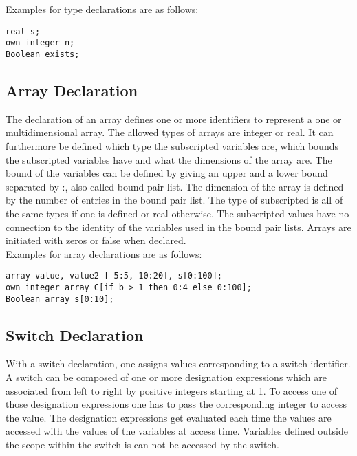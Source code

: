 \documentclass{article}
\begin{document}
Examples for type declarations are as follows:\\ 
\begin{lstlisting}[language={[60]algol}]
real s;
own integer n;
Boolean exists;
\end{lstlisting}

\subsection{Array Declaration} \label{arrayDecl}
The declaration of an array defines one or more identifiers to represent a one or multidimensional array. The allowed types of arrays are integer or real. It can furthermore be defined which type the subscripted variables are, which bounds the subscripted variables have and what the dimensions of the array are. The bound of the variables can be defined by giving an upper and a lower bound separated by :, also called bound pair list. The dimension of the array is defined by the number of entries in the bound pair list. The type of subscripted is all of the same types if one is defined or real otherwise. The subscripted values have no connection to the identity of the variables used in the bound pair lists. Arrays are initiated with zeros or false when declared.\\

Examples for array declarations are as follows:\\ 
\begin{lstlisting}[language={[60]algol}]
array value, value2 [-5:5, 10:20], s[0:100];
own integer array C[if b > 1 then 0:4 else 0:100];
Boolean array s[0:10];
\end{lstlisting}

\subsection{Switch Declaration} \label{switchDecl}
With a switch declaration, one assigns values corresponding to a switch identifier. A switch can be composed of one or more designation expressions which are associated from left to right by positive integers starting at 1. To access one of those designation expressions one has to pass the corresponding integer to access the value. The designation expressions get evaluated each time the values are accessed with the values of the variables at access time. Variables defined outside the scope within the switch is can not be accessed by the switch.\\
\end{document}
